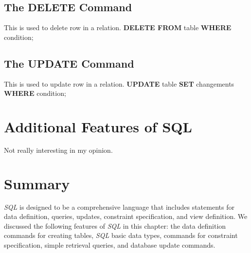 \subsection{The DELETE Command}
This is used to delete row in a relation. \textbf{DELETE FROM} table \textbf{WHERE} condition;
\subsection{The UPDATE Command}
This is used to update row in a relation. \textbf{UPDATE} table \textbf{SET} changements \textbf{WHERE} condition;
\section{Additional Features of SQL}
Not really interesting in my opinion.
\section{Summary}
\textit{SQL} is designed to be a comprehensive language that includes statements for data definition, queries, updates, constraint specification, and view definition. We discussed the following features of \textit{SQL} in this chapter: the data definition commands for creating tables, \textit{SQL} basic data types, commands for constraint specification, simple retrieval queries, and database update commands.

 
